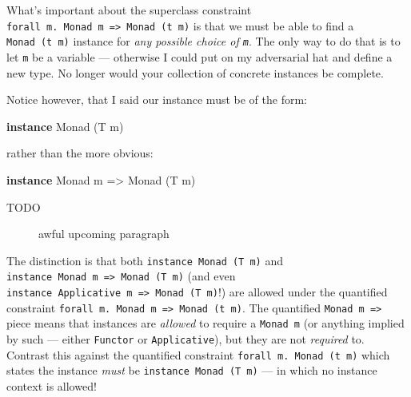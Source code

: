 \documentclass[
  11pt,
]{book}
\newenvironment{Shaded}{}{}
\newcommand{\DataTypeTok}[1]{\textcolor[rgb]{0.56,0.13,0.00}{#1}}
\newcommand{\KeywordTok}[1]{\textcolor[rgb]{0.00,0.44,0.13}{\textbf{#1}}}
\newcommand{\NormalTok}[1]{#1}
\newcommand{\OtherTok}[1]{\textcolor[rgb]{0.00,0.44,0.13}{#1}}
\theoremstyle{nonumberplain}
\begin{document}
What's important about the superclass constraint
\texttt{forall\ m.\ Monad\ m\ =\textgreater{}\ Monad\ (t\ m)} is that we
must be able to find a \texttt{Monad\ (t\ m)} instance for \emph{any
possible choice of \texttt{m}}. The only way to do that is to let
\texttt{m} be a variable --- otherwise I could put on my adversarial hat
and define a new type. No longer would your collection of concrete
instances be complete.

Notice however, that I said our instance must be of the form:

\begin{Shaded}
\begin{Highlighting}[]
\KeywordTok{instance} \DataTypeTok{Monad}\NormalTok{ (}\DataTypeTok{T}\NormalTok{ m)}
\end{Highlighting}
\end{Shaded}

\noindent rather than the more obvious:

\begin{Shaded}
\begin{Highlighting}[]
\KeywordTok{instance} \DataTypeTok{Monad}\NormalTok{ m }\OtherTok{=\textgreater{}} \DataTypeTok{Monad}\NormalTok{ (}\DataTypeTok{T}\NormalTok{ m)}
\end{Highlighting}
\end{Shaded}

\begin{description}
\item[TODO]
awful upcoming paragraph
\end{description}

The distinction is that both \texttt{instance\ Monad\ (T\ m)} and
\texttt{instance\ Monad\ m\ =\textgreater{}\ Monad\ (T\ m)} (and even
\texttt{instance\ Applicative\ m\ =\textgreater{}\ Monad\ (T\ m)}!) are
allowed under the quantified constraint
\texttt{forall\ m.\ Monad\ m\ =\textgreater{}\ Monad\ (t\ m)}. The
quantified \texttt{Monad\ m\ =\textgreater{}} piece means that instances
are \emph{allowed} to require a \texttt{Monad\ m} (or anything implied
by such --- either \texttt{Functor} or \texttt{Applicative}), but they
are not \emph{required} to. Contrast this against the quantified
constraint \texttt{forall\ m.\ Monad\ (t\ m)} which states the instance
\emph{must} be \texttt{instance\ Monad\ (T\ m)} --- in which no instance
context is allowed!

\backmatter
\end{document}
